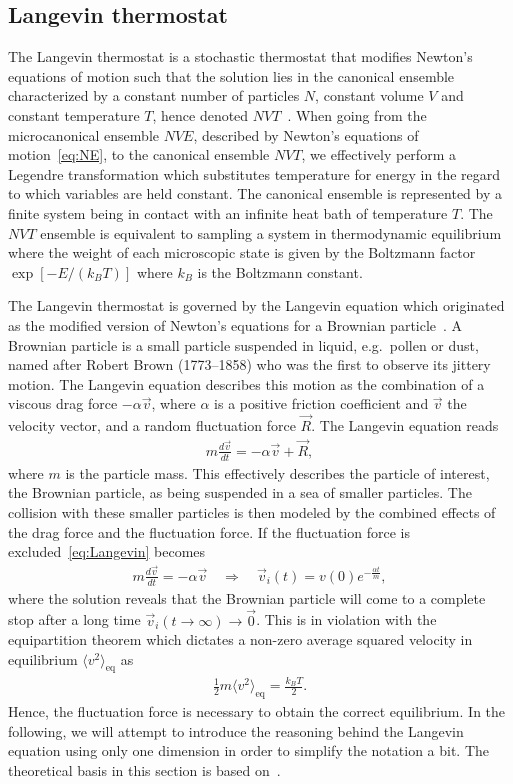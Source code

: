 \subsection{Langevin thermostat} \label{sec:langevin}
The Langevin thermostat is a stochastic thermostat that modifies Newton's
equations of motion such that the solution lies in the canonical ensemble
characterized by a constant number of particles $N$, constant volume $V$ and
constant temperature $T$, hence denoted $NVT$~\cite{Manini_2016}. When going from the microcanonical ensemble $NVE$, described by Newton's equations of motion~\cref{eq:NE}, to the canonical ensemble $NVT$, we effectively perform a Legendre transformation which substitutes temperature for energy in the regard to which variables are held constant. The canonical ensemble is represented by a finite system being in contact with an infinite heat bath of temperature $T$. The $NVT$ ensemble is equivalent to sampling a system in thermodynamic equilibrium where the weight of each microscopic state is given by the Boltzmann factor $\exp[-E/(k_B T)]$ where $k_B$ is the Boltzmann constant. 

The Langevin thermostat is governed by the Langevin equation which originated as the modified version of Newton's equations for a Brownian particle~\cite{stat_phys}. A Brownian particle is a small particle suspended in liquid,
e.g.\ pollen or dust, named after Robert Brown (1773–1858) who was the first to
observe its jittery motion. The Langevin equation describes this motion as the
combination of a viscous drag force $ -\alpha \vec{v}$, where $\alpha$ is a
positive friction coefficient and $\vec{v}$ the velocity vector, and a random
fluctuation force $\vec{R}$. The Langevin equation reads
\begin{align}
  m \frac{d \vec{v}}{dt} = -\alpha \vec{v} + \vec{R},
  \label{eq:Langevin}
\end{align}
where $m$ is the particle mass. This effectively describes the particle of
interest, the Brownian particle, as being suspended in a sea of smaller
particles. The collision with these smaller particles is then modeled by the combined effects of the drag force and the fluctuation force. If the fluctuation force is excluded~\cref{eq:Langevin} becomes 
\begin{align*}
  m \frac{d \vec{v}}{dt} = -\alpha \vec{v} \quad \Rightarrow \quad 
  \vec{v}_i(t) = v(0)e^{- \frac{\alpha t}{m}},
\end{align*}
where the solution reveals that the Brownian particle will come to a complete stop
after a long time ${\vec{v}_i(t\to\infty) \to \vec{0}}$. This is in violation
with the equipartition theorem which dictates a non-zero average squared velocity in equilibrium $\langle v^2 \rangle_{\text{eq}}$ as
\begin{align}
  \frac{1}{2}m\langle v^2 \rangle_{\text{eq}} = \frac{k_B T}{2}.
  \label{eq:equipartion}
\end{align}
Hence, the fluctuation force is necessary to obtain the correct equilibrium. In the following, we will attempt to introduce the reasoning behind the Langevin equation using only one dimension in order to simplify the notation a bit. The theoretical basis in this section is based on~\cite{stat_phys}.

